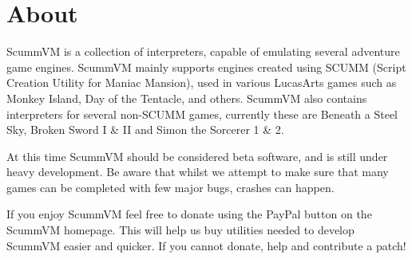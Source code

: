 


\section{About}

ScummVM is a collection of interpreters, capable of emulating several
adventure game engines. ScummVM mainly supports engines created using 
SCUMM (Script Creation Utility for Maniac Mansion), used in various
LucasArts games such as Monkey Island, Day of the Tentacle, and others.
ScummVM also contains interpreters for several non-SCUMM games, currently
these are Beneath a Steel Sky, Broken Sword I \& II and Simon the Sorcerer 1 \& 2.

At this time ScummVM should be considered beta software, and is still
under heavy development. Be aware that whilst we attempt to make sure
that many games can be completed with few major bugs, crashes can happen.

If you enjoy ScummVM feel free to donate using the PayPal button on the
ScummVM homepage. This will help us buy utilities needed to develop ScummVM
easier and quicker. If you cannot donate, help and contribute a patch!
